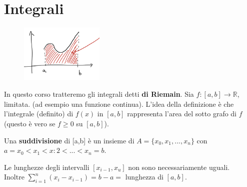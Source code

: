 \newpage
\section{Integrali}
\begin{figure}
    \vspace{-25pt}
    \centering
    \includegraphics[width=4cm]{images/area-sottografico.png}
\end{figure}
In questo corso tratteremo gli integrali detti \textbf{di Riemain}.
Sia $f: [a,b] \to \mathbb{R}$, limitata. (ad esempio una funzione continua). L'idea della definizione è che l'integrale (definito) di $f(x)$ in $[a,b]$ rappresenta l'area del sotto grafo di $f$  (questo è vero se $f \geq 0$ su $[a,b]$).

\begin{definition}
Una \textbf{suddivisione} di [a,b] è un insieme di $A = \{x_0, x_1, ..., x_n\}$ con $a = x_0 < x_1 < x:2 < ... < x_n = b$.
\end{definition}
\begin{observation}
Le lunghezze degli intervalli $[x_{i-1}, x_u]$ non sono necessariamente uguali.\\
Inoltre $\sum\limits_{i=1}^n(x_i - x_{i-1}) = b - a = $ lunghezza di $[a,b]$.
\end{observation}

